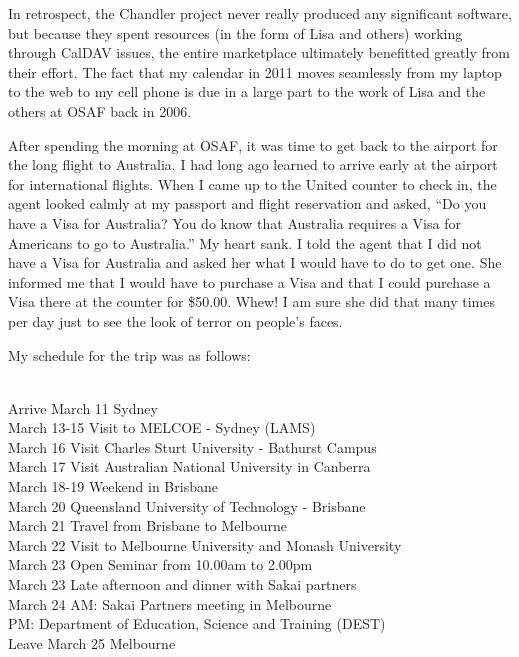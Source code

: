 \documentclass[12pt]{book}
\begin{document}
In retrospect, the Chandler project never really
produced any significant software, but because
they spent resources (in the form of Lisa and others)
working through CalDAV issues, the entire marketplace
ultimately benefitted greatly from their effort.
The fact that my calendar in 2011 moves seamlessly from
my laptop to the web to my cell phone is
due in a large part to the work of Lisa and
the others at OSAF back in 2006.

After spending the morning at OSAF, it was time
to get back to the airport for the long flight
to Australia.  I had long ago learned to arrive
early at the airport for international
flights.  When I came up to the United counter
to check in, the agent looked calmly at my
passport and flight reservation and asked,
``Do you have a Visa for Australia?  You do
know that Australia requires a Visa for Americans
to go to Australia.''  My heart sank.  I
told the agent that I did not have a Visa for
Australia and asked her what I would have to
do to get one.  She informed me that I would have to
purchase a Visa and
that I could purchase a Visa
there at the counter for \$50.00.  Whew!
I am sure she did that many times per day
just to see the look of terror on people's faces.

My schedule for the trip was as follows:\\
\\
\begin{sf}
Arrive March 11 Sydney\\
March 13-15 Visit to MELCOE - Sydney (LAMS)\\
March 16 Visit Charles Sturt University - Bathurst Campus\\
March 17 Visit Australian National University in Canberra\\
March 18-19 Weekend in Brisbane\\
March 20 Queensland University of Technology - Brisbane\\
March 21 Travel from Brisbane to Melbourne\\
March 22 Visit to Melbourne University and Monash University\\
March 23 Open Seminar  from 10.00am to 2.00pm\\
March 23 Late afternoon and dinner with Sakai partners \\
March 24 AM: Sakai Partners meeting in Melbourne \\
         PM: Department of Education, Science and Training (DEST) \\
Leave March 25 Melbourne\\
\end{sf}
\end{document}
